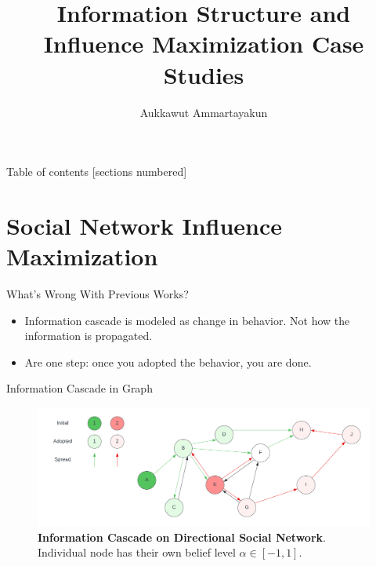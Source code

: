 \documentclass[10pt]{beamer}
\title{Information Structure and Influence Maximization Case Studies}
\date{}
\author{Aukkawut Ammartayakun}
\institute{University of Tennessee, Knoxville}
\begin{document}
\maketitle
\begin{frame}{Table of contents}
  [sections numbered]
  \tableofcontents%
\end{frame}
\section{Social Network Influence Maximization}
\begin{frame}{What's Wrong With Previous Works?}
    \begin{itemize}
        \item Information cascade is modeled as change in behavior. Not how the information is propagated.
        \item Are one step: once you adopted the behavior, you are done.
    \end{itemize}
\end{frame}
\begin{frame}{Information Cascade in Graph}
\begin{figure}
    \centering
    \includegraphics[width=1\linewidth]{graph1.pdf}
    \caption{\textbf{Information Cascade on Directional Social Network}. Individual node has their own belief level $\alpha \in [-1,1]$.}
    \label{fig:1}
\end{figure}
\end{frame}
\end{document}
